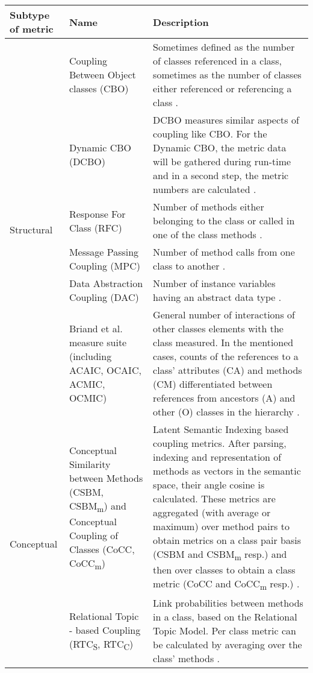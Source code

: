 \begin{table*}[t]
    \centering
    \begin{tabular}{p{2cm} p{4cm} p{10cm}}
        \toprule
            \textbf{Subtype of metric} & \textbf{Name} & \textbf{Description} \\
        \midrule
            \multirow{6}{*}{Structural} 
             & Coupling Between Object classes (CBO)	& Sometimes defined as the number of classes referenced in a class, sometimes as the number of classes either referenced or referencing a class \cite{s89_coupling, s29_cohesion, s116_maintainability}.\\
            \cmidrule(rl){2-3} & Dynamic CBO (DCBO) & DCBO measures similar aspects of coupling like CBO. For the Dynamic CBO, the metric data will be gathered during run-time and in a second step, the metric numbers are calculated \cite{s88_coupling}. \\
            \cmidrule(rl){2-3} & Response For Class (RFC) & Number of methods either belonging to the class or called in one of the class methods \cite{s89_coupling, s13_maintainability, s116_maintainability}.  \\
            \cmidrule(rl){2-3} & Message Passing Coupling (MPC) & Number of method calls from one class to another \cite{s89_coupling, s13_maintainability, s29_cohesion, s116_maintainability}. \\
            \cmidrule(rl){2-3} & Data Abstraction Coupling (DAC) & Number of instance variables having an abstract data type \cite{s89_coupling, s13_maintainability}.\\
            \cmidrule(rl){2-3} & Briand et al. measure suite (including ACAIC, OCAIC, ACMIC, OCMIC) & General number of interactions of other classes elements with the class measured. In the mentioned cases, counts of the references to a class' attributes (CA) and methods (CM) differentiated between references from ancestors (A) and other (O) classes in the hierarchy \cite{s89_coupling}. \\
        \midrule
            \multirow[p]{2}{*}{Conceptual} 
            & Conceptual Similarity between Methods (CSBM, CSBM\textsubscript{m}) and Conceptual Coupling of Classes (CoCC, CoCC\textsubscript{m})  & Latent  Semantic  Indexing based coupling metrics. After parsing, indexing and representation of methods as vectors in the semantic space, their angle cosine is calculated. These metrics are aggregated (with average or maximum) over method pairs to obtain metrics on a class pair basis (CSBM and CSBM\textsubscript{m} resp.) and then over classes to obtain a class metric (CoCC and CoCC\textsubscript{m} resp.) \cite{s89_coupling}.\\
            \cmidrule(rl){2-3} & Relational Topic - based Coupling (RTC\textsubscript{S}, RTC\textsubscript{C}) & Link probabilities between methods in a class, based on the Relational Topic Model. Per class metric can be calculated by averaging over the class' methods \cite{s89_coupling}. \\
          

\end{tabular}
\end{table*}
